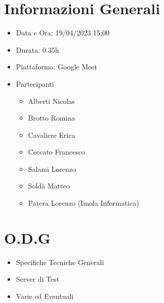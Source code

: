 \documentclass[a4paper, 12pt]{article}
\begin{document}
\makefrontpage
\section*{Informazioni Generali}
\begin{itemize}
    \item Data e Ora: 19/04/2023 15:00
    \item Durata: 0.35h
    \item Piattaforma: Google Meet
    \item Partecipanti
    \begin{itemize}
        \item Alberti Nicolas
        \item Brotto Romina
        \item Cavaliere Erica
        \item Ceccato Francesco
        \item Salami Lorenzo
        \item Soldà Matteo
        \item Patera Lorenzo (Imola Informatica)
    \end{itemize}
\end{itemize}
\section*{O.D.G}
\begin{itemize}
    \item Specifiche Tecniche Generali
    \item Server di Test
    \item Varie ed Eventuali
\end{itemize}
\end{document}
